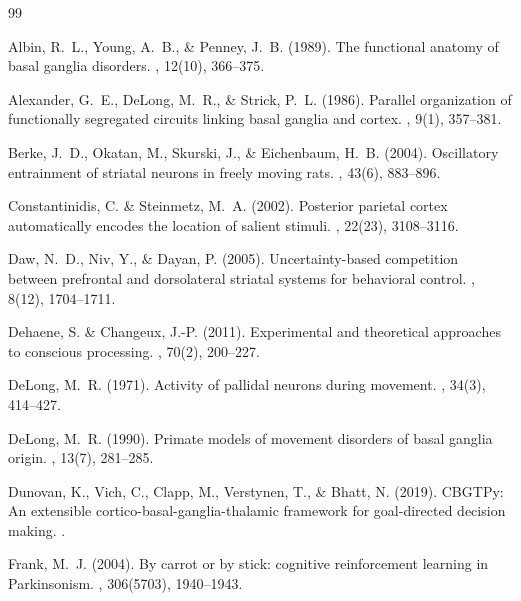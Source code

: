 \documentclass[11pt,a4paper]{article}
\begin{document}
\begin{thebibliography}{99}

Albin, R.~L., Young, A.~B., \& Penney, J.~B. (1989).
\newblock The functional anatomy of basal ganglia disorders.
, 12(10), 366--375.

Alexander, G.~E., DeLong, M.~R., \& Strick, P.~L. (1986).
\newblock Parallel organization of functionally segregated circuits linking basal ganglia and cortex.
, 9(1), 357--381.

Berke, J.~D., Okatan, M., Skurski, J., \& Eichenbaum, H.~B. (2004).
\newblock Oscillatory entrainment of striatal neurons in freely moving rats.
, 43(6), 883--896.

Constantinidis, C. \& Steinmetz, M.~A. (2002).
\newblock Posterior parietal cortex automatically encodes the location of salient stimuli.
, 22(23), 3108--3116.

Daw, N.~D., Niv, Y., \& Dayan, P. (2005).
\newblock Uncertainty-based competition between prefrontal and dorsolateral striatal systems for behavioral control.
, 8(12), 1704--1711.

Dehaene, S. \& Changeux, J.-P. (2011).
\newblock Experimental and theoretical approaches to conscious processing.
, 70(2), 200--227.

DeLong, M.~R. (1971).
\newblock Activity of pallidal neurons during movement.
, 34(3), 414--427.

DeLong, M.~R. (1990).
\newblock Primate models of movement disorders of basal ganglia origin.
, 13(7), 281--285.

Dunovan, K., Vich, C., Clapp, M., Verstynen, T., \& Bhatt, N. (2019).
\newblock CBGTPy: An extensible cortico-basal-ganglia-thalamic framework for goal-directed decision making.
.

Frank, M.~J. (2004).
\newblock By carrot or by stick: cognitive reinforcement learning in Parkinsonism.
, 306(5703), 1940--1943.


\end{thebibliography}
\end{document}
